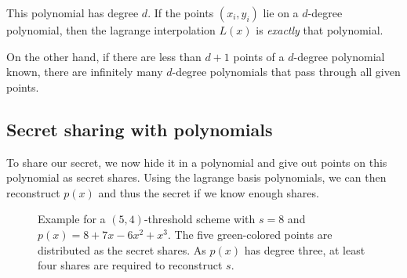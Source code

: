 This polynomial has degree $d$. If the points $(x_i, y_i)$ lie on a $d$-degree polynomial, then the lagrange interpolation $L(x)$ is \emph{exactly} that polynomial.

On the other hand, if there are less than $d+1$ points of a $d$-degree polynomial known, there are infinitely many $d$-degree polynomials that pass through all given points.~\cite{shamir_how_1979}


\subsection{Secret sharing with polynomials}
To share our secret, we now hide it in a polynomial and give out points on this polynomial as secret shares.
Using the lagrange basis polynomials, we can then reconstruct $p(x)$ and thus the secret if we know enough shares.~\cite{shamir_how_1979}

\begin{figure}
    \centering
    \caption[Plot of $(5,4)$-threshold secret sharing scheme]{
        Example for a $(5, 4)$-threshold scheme with $s=8$ and $p(x) = 8 + 7x - 6x^2 + x^3$.
        The five green-colored points are distributed as the secret shares.
        As $p(x)$ has degree three, at least four shares are required to reconstruct $s$.
    }
    \label{fig:sss}
\end{figure}

